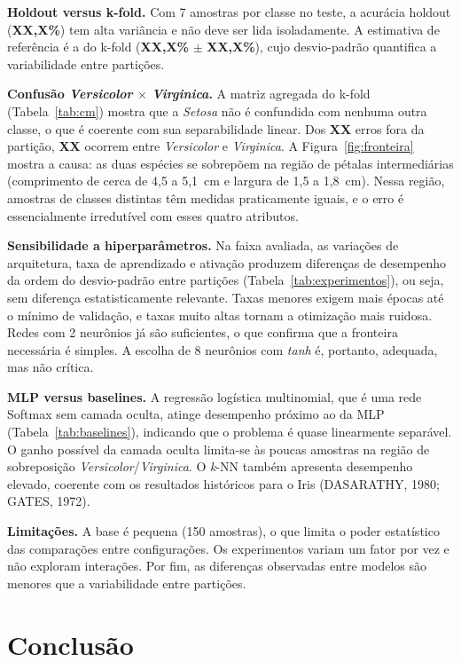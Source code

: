 \documentclass[12pt,a4paper]{article}
\newcommand{\XX}{\textbf{XX,X\%}}
\newcommand{\XN}{\textbf{XX}}
\newcommand{\AccTeste}{\XX}      \newcommand{\FUmTeste}{\XX}     \newcommand{\CETeste}{\XN}
\newcommand{\AccKfold}{\XX}      \newcommand{\DPKfold}{\XX}
\newcommand{\ErrosVerVir}{\XN}   \newcommand{\ErrosTotalKfold}{\XN}
\begin{document}
\textbf{Holdout versus k-fold.} Com 7 amostras por classe no teste, a acurácia holdout
(\AccTeste) tem alta variância e não deve ser lida isoladamente. A estimativa de referência é a do
k-fold (\AccKfold{} $\pm$ \DPKfold), cujo desvio-padrão quantifica a variabilidade entre partições.

\textbf{Confusão \textit{Versicolor} $\times$ \textit{Virginica}.} A matriz agregada do k-fold
(Tabela~\ref{tab:cm}) mostra que a \textit{Setosa} não é confundida com nenhuma outra classe, o que é
coerente com sua separabilidade linear. Dos \ErrosTotalKfold{} erros fora da partição,
\ErrosVerVir{} ocorrem entre \textit{Versicolor} e \textit{Virginica}. A Figura~\ref{fig:fronteira}
mostra a causa: as duas espécies se sobrepõem na região de pétalas intermediárias (comprimento de
cerca de 4,5 a 5,1~cm e largura de 1,5 a 1,8~cm). Nessa região, amostras de classes distintas têm
medidas praticamente iguais, e o erro é essencialmente irredutível com esses quatro atributos.

\textbf{Sensibilidade a hiperparâmetros.} Na faixa avaliada, as variações de arquitetura, taxa de
aprendizado e ativação produzem diferenças de desempenho da ordem do desvio-padrão entre partições
(Tabela~\ref{tab:experimentos}), ou seja, sem diferença estatisticamente relevante. Taxas menores
exigem mais épocas até o mínimo de validação, e taxas muito altas tornam a otimização mais ruidosa.
Redes com 2 neurônios já são suficientes, o que confirma que a fronteira necessária é simples. A
escolha de 8 neurônios com \textit{tanh} é, portanto, adequada, mas não crítica.

\textbf{MLP versus baselines.} A regressão logística multinomial, que é uma rede Softmax sem camada
oculta, atinge desempenho próximo ao da MLP (Tabela~\ref{tab:baselines}), indicando que o problema é
quase linearmente separável. O ganho possível da camada oculta limita-se às poucas amostras na região
de sobreposição \textit{Versicolor}/\textit{Virginica}. O \textit{k}-NN também apresenta desempenho
elevado, coerente com os resultados históricos para o Iris (DASARATHY, 1980; GATES, 1972).

\textbf{Limitações.} A base é pequena (150 amostras), o que limita o poder estatístico das
comparações entre configurações. Os experimentos variam um fator por vez e não exploram interações.
Por fim, as diferenças observadas entre modelos são menores que a variabilidade entre partições.

\section{Conclusão}
\label{sec:conclusao}
\end{document}
